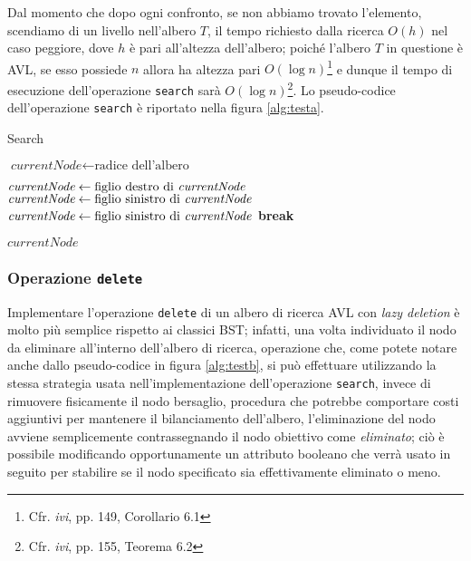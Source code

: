 \documentclass[10pt,a4paper,titlepage]{article}
\begin{document}
Dal momento che dopo ogni confronto, se non abbiamo trovato l'elemento, scendiamo di un livello nell'albero $T$, il tempo richiesto dalla ricerca $O(h)$ nel caso peggiore, dove $h$ è pari all'altezza dell'albero; poiché l'albero $T$ in questione è AVL, se esso possiede $n$ allora ha altezza pari $O(\log n)$\footnote{Cfr. \textit{ivi}, pp. 149, Corollario 6.1} e dunque il tempo di esecuzione dell'operazione \texttt{search} sarà $O(\log n)$\footnote{Cfr. \textit{ivi}, pp. 155, Teorema 6.2}.
Lo pseudo-codice dell'operazione \texttt{search} è riportato nella figura \ref{alg:testa}.

\begin{center}
\begin{algorithm}
\caption{Search}\label{alg:testa}
\begin{algorithmic}[1]

\State $\textit{currentNode} \gets \text{radice dell'albero}$


	\State $\textit{currentNode} \gets \text{figlio destro di \textit{currentNode}}$
	\State $\textit{currentNode} \gets \text{figlio sinistro di \textit{currentNode}}$
\Else 
 		\State $\textit{currentNode} \gets \text{figlio sinistro di \textit{currentNode}}$
 	\Else 	
 		\State \textbf{break}
 		
\EndIf
\EndIf
\EndWhile

\State \Return $\textit{currentNode}$

\EndFunction
\end{algorithmic}
\end{algorithm}
\end{center}
\subsubsection{Operazione \texttt{delete}}

Implementare l'operazione \texttt{delete} di un albero di ricerca AVL con \textit{lazy deletion} è molto più semplice rispetto ai classici BST; infatti, una volta individuato il nodo da eliminare all'interno dell'albero di ricerca, operazione che, come potete notare anche dallo pseudo-codice in figura \ref{alg:testb}, si può effettuare utilizzando la stessa strategia usata nell'implementazione dell'operazione \texttt{search}, invece di rimuovere fisicamente il nodo bersaglio, procedura che potrebbe comportare costi aggiuntivi per mantenere il bilanciamento dell'albero, l'eliminazione del nodo avviene semplicemente contrassegnando il nodo obiettivo come \textit{eliminato}; ciò è possibile modificando opportunamente un attributo booleano che verrà usato in seguito per stabilire se il nodo specificato sia effettivamente eliminato o meno. 
\end{document}
